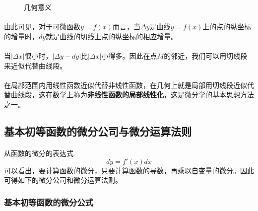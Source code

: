 \begin{figure}[H]
  \centering
    
    \caption{几何意义}
    \label{differential_geometric_meaning}
\end{figure}

\paragraph{}
由此可见，对于可微函数$y=f(x)$而言，当$\Delta y$是曲线$y=f(x)$上的点的纵坐标的增量时，$dy$就是曲线的切线上点的纵坐标的相应增量。

\paragraph{}
当$|\Delta x|$很小时，$|\Delta y - dy|$比$|\Delta x|$小得多。因此在点$M$的邻近，我们可以用切线段来近似代替曲线段。

\paragraph{}
在局部范围内用线性函数近似代替非线性函数，在几何上就是局部用切线段近似代替曲线段，这在数学上称为\textbf{非线性函数的局部线性化}，这是微分学的基本思想方法之一。

\subsection{基本初等函数的微分公司与微分运算法则}
\paragraph{}
从函数的微分的表达式
\begin{equation}
  dy = f'(x)dx
\end{equation}
可以看出，要计算函数的微分，只要计算函数的导数，再乘以自变量的微分。因此可得如下的微分公司和微分运算法则。

\subsubsection{基本初等函数的微分公式}
\paragraph{}

